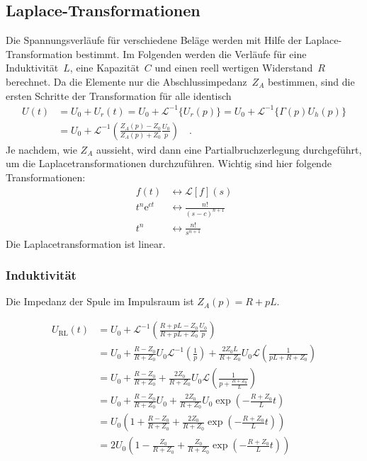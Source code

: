 \subsection{Laplace-Transformationen} \label{seq:laplace}
Die Spannungsverläufe für verschiedene Beläge werden mit Hilfe der Laplace-Transformation bestimmt. Im Folgenden werden die Verläufe für eine Induktivität~$L$, eine Kapazität~$C$ und einen reell wertigen Widerstand~$R$ berechnet. Da die Elemente nur die Abschlussimpedanz~$Z_A$ bestimmen, sind die ersten Schritte der Transformation für alle identisch
\begin{align}
	U(t) &= U_0 + U_r(t) = U_0 + \mathcal{L}^{-1} \{U_r(p) \} 
	= U_0 + \mathcal{L}^{-1} \{\Gamma(p) U_h(p) \} \\
&= U_0 + \mathcal{L}^{-1}\left(\frac{Z_A(p)-Z_0}{Z_A(p)+Z_0}\frac{U_0}{p}\right) \quad .
\end{align}
Je nachdem, wie $Z_A$ aussieht, wird dann eine Partialbruchzerlegung durchgeführt, um die Laplacetransformationen durchzuführen. Wichtig sind hier folgende Transformationen:
\begin{align}
	f(t) &\leftrightarrow \mathcal{L}[f](s)  \\
	t^n\textrm{e}^{ct} &\leftrightarrow \frac{n!}{(s-c)^{n+1}} \\
	t^n &\leftrightarrow \frac{n!}{s^{n+1}}
\end{align}
Die Laplacetransformation ist linear.
\subsubsection{Induktivität}
Die Impedanz der Spule im Impulsraum ist $Z_A(p) = R + pL$.

\begin{align*}
	U_\text{RL}(t) 
	&= U_0 + \mathcal{L}^{-1}\left(\frac{R+pL-Z_0}{R+pL+Z_0}\frac{U_0}{p}\right) \\
	 &= U_0 + \frac{R-Z_0}{R+Z_0}U_0\mathcal{L}^{-1}\left(\frac{1}{p}\right) + \frac{2Z_0L}{R+Z_0}U_0\mathcal{L}\left(\frac{1}{pL+R+Z_0}\right) \\
	 	 &= U_0 + \frac{R-Z_0}{R+Z_0} + \frac{2Z_0}{R+Z_0}U_0\mathcal{L}\left(\frac{1}{p+\frac{R+Z_0}{L}}\right) \\
	&= U_0 + \frac{R-Z_0}{R+Z_0}U_0 + \frac{2Z_0}{R+Z_0}U_0\exp\left(-\frac{R+Z_0}{L}t\right) \\
	&= U_0\left(1 + \frac{R-Z_0}{R+Z_0} + \frac{2Z_0}{R+Z_0}\exp\left(-\frac{R+Z_0}{L}t\right)\right) \\
		&= 2U_0\left(1 - \frac{Z_0}{R+Z_0} + \frac{Z_0}{R+Z_0}\exp\left(-\frac{R+Z_0}{L}t\right)\right)
\end{align*}
\clearpage
